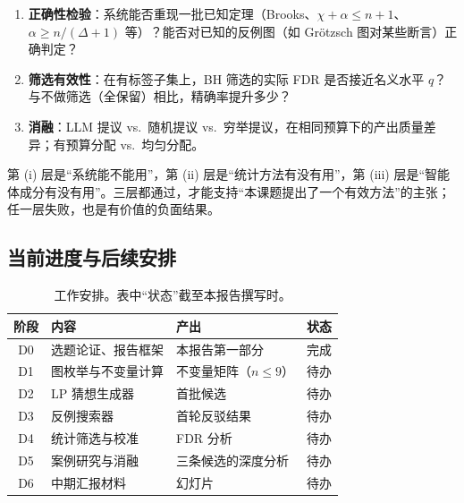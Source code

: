 \begin{enumerate}[label=(\roman*)]
  \item \textbf{正确性检验}：系统能否重现一批已知定理（Brooks、$\chi+\alpha\le n+1$、$\alpha\ge n/(\Delta+1)$ 等）？能否对已知的反例图（如 Grötzsch 图对某些断言）正确判定？
  \item \textbf{筛选有效性}：在有标签子集上，BH 筛选的实际 FDR 是否接近名义水平 $q$？与不做筛选（全保留）相比，精确率提升多少？
  \item \textbf{消融}：LLM 提议 vs.\ 随机提议 vs.\ 穷举提议，在相同预算下的产出质量差异；有预算分配 vs.\ 均匀分配。
\end{enumerate}

第 (i) 层是“系统能不能用”，第 (ii) 层是“统计方法有没有用”，第 (iii) 层是“智能体成分有没有用”。三层都通过，才能支持“本课题提出了一个有效方法”的主张；任一层失败，也是有价值的负面结果。

\subsection{当前进度与后续安排}
\label{sec:r-progress}

\begin{table}[H]
\centering
\caption{工作安排。表中“状态”截至本报告撰写时。}
\label{tab:schedule}
\small
\begin{tabular}{@{}clp{6.4cm}l@{}}
\toprule
阶段 & 内容 & 产出 & 状态 \\
\midrule
D0 & 选题论证、报告框架 & 本报告第一部分 & 完成 \\
D1 & 图枚举与不变量计算 & 不变量矩阵（$n\le 9$） & 待办 \\
D2 & LP 猜想生成器 & 首批候选 & 待办 \\
D3 & 反例搜索器 & 首轮反驳结果 & 待办 \\
D4 & 统计筛选与校准 & FDR 分析 & 待办 \\
D5 & 案例研究与消融 & 三条候选的深度分析 & 待办 \\
D6 & 中期汇报材料 & 幻灯片 & 待办 \\
\bottomrule
\end{tabular}
\end{table}
